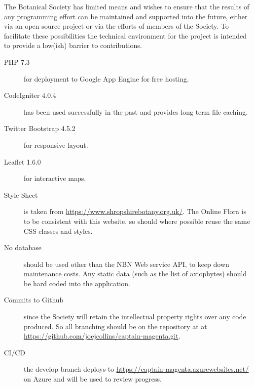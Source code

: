 \documentclass[a4paper,12pt,landscape]{article}
\begin{document}
The Botanical Society has limited means
and wishes to ensure that the results of any programming effort
can be maintained and supported
into the future,
either via an open source project or via the efforts of members of the Society.
To facilitate these possibilities
the technical environment for the project is intended 
to provide a low(ish) barrier to contributions.

\begin{description}
    \item[PHP 7.3] for deployment to Google App Engine for free hosting.
    \item[CodeIgniter 4.0.4] has been used successfully in the past and provides long term file caching.
    \item[Twitter Bootstrap 4.5.2] for responsive layout.
    \item[Leaflet 1.6.0] for interactive maps.
    \item[Style Sheet] is taken from \url{https://www.shropshirebotany.org.uk/}.
      The Online Flora is to be consistent with this website,
      so should where possible reuse the same CSS classes and styles.
    \item[No database] should be used other than the NBN Web service API,
      to keep down maintenance costs.
      Any static data 
      (such as the list of axiophytes)
      should be hard coded into the application.

    \item[Commits to Github] since the Society will retain the intellectual property rights
      over any code produced.
      So all branching should be on the repository at
      at \url{https://github.com/joejcollins/captain-magenta.git}.
    \item[CI/CD] the develop branch deploys to \url{https://captain-magenta.azurewebsites.net/} on Azure
      and will be used to review progress.
\end{description}
\end{document}
